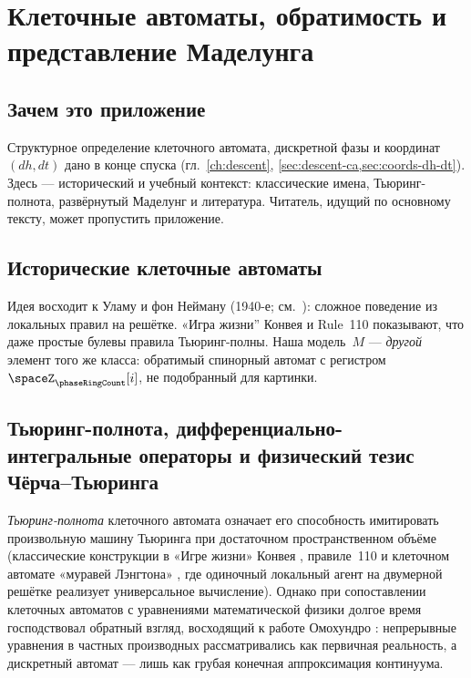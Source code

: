 \chapter{Клеточные автоматы, обратимость и представление Маделунга}
\label{app:background}

\section{Зачем это приложение}

Структурное определение клеточного автомата, дискретной фазы и координат $(dh,dt)$
дано в конце спуска (гл.~\ref{ch:descent}, \cref{sec:descent-ca,sec:coords-dh-dt}).
Здесь --- исторический и учебный контекст: классические имена, Тьюринг-полнота,
развёрнутый Маделунг и литература.
Читатель, идущий по основному тексту, может пропустить приложение.

\section{Исторические клеточные автоматы}

Идея восходит к Уламу и фон Нейману (1940-е; см.\ \cite{vonneumann1966}):
сложное поведение из локальных правил на решётке.
«Игра жизни'' Конвея \cite{gardner1970} и Rule~110 \cite{cook2004}
показывают, что даже простые булевы правила Тьюринг-полны.
Наша модель~$M$ --- \emph{другой} элемент того же класса:
обратимый спинорный автомат с регистром $\spaceZ_{\phaseRingCount}[i]$, не подобранный для картинки.

\section{Тьюринг-полнота, дифференциально-интегральные операторы и физический тезис Чёрча--Тьюринга}
\label{sec:app-universality}

\emph{Тьюринг-полнота} клеточного автомата означает его способность имитировать произвольную машину Тьюринга при достаточном пространственном объёме (классические конструкции в «Игре жизни» Конвея \cite{gardner1970}, правиле~110 \cite{cook2004} и клеточном автомате «муравей Лэнгтона» \cite{langton1986}, где одиночный локальный агент на двумерной решётке реализует универсальное вычисление).
Однако при сопоставлении клеточных автоматов с уравнениями математической физики долгое время господствовал обратный взгляд, восходящий к работе Омохундро \cite{omohundro1984}:
непрерывные уравнения в частных производных рассматривались как первичная реальность, а дискретный автомат --- лишь как грубая конечная аппроксимация континуума.

